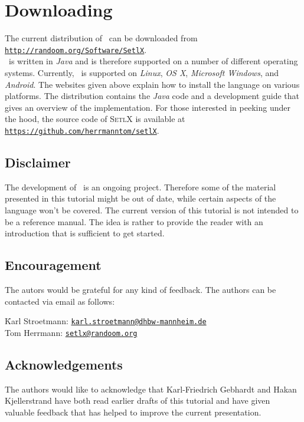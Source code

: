 \section*{Downloading}
The current distribution of  \setlx\ can be downloaded from 
\\[0.2cm]
\hspace*{1.3cm}
\href{http://randoom.org/Software/SetlX}{\texttt{http://randoom.org/Software/SetlX}}.
\\[0.2cm]
\setlx\ is
written in \textsl{Java} and is therefore supported on a number of different operating
systems.  Currently, \setlx\ is supported on \textsl{Linux}, \textsl{OS X},
\textsl{Microsoft Windows}, and \textsl{Android}.  
The websites given above explain how to install the language on various platforms.  
The distribution contains the \textsl{Java} code and a development guide that gives an
overview of the implementation. For those
interested in peeking under the hood, the source code of \textsc{SetlX}
is available at
\\[0.2cm]
\hspace*{1.3cm}
\href{https://github.com/herrmanntom/setlX}{\texttt{https://github.com/herrmanntom/setlX}}.



\subsection*{Disclaimer}
The development of \setlx\ is an ongoing project.  Therefore some of the material presented in
this tutorial might be out of date, while certain aspects of the language won't be
covered.  The current version of this tutorial is not intended to be a reference manual.
The idea is rather to provide the reader with an introduction that is sufficient to get started.

\subsection*{Encouragement}
The autors would be grateful for any kind of feedback.  The authors can be contacted via
email as follows:
\begin{tabbing}
\qquad \= Karl Stroetmann: \qquad \= \href{mailto:karl.stroetmann@dhbw-mannheim.de}{\texttt{karl.stroetmann@dhbw-mannheim.de}} \\[0.2cm]
       \> Tom Herrmann:           \> \href{mailto:setlx@randoom.org}{\texttt{setlx@randoom.org}}
\end{tabbing}

\subsection*{Acknowledgements}
The authors would like to acknowledge that Karl-Friedrich Gebhardt and Hakan Kjellerstrand 
have both  read earlier drafts of
this tutorial and have given valuable feedback that has helped to improve the current
presentation. 

